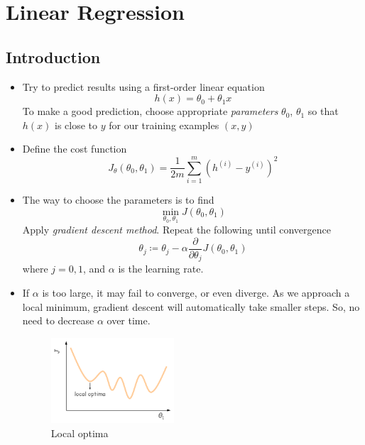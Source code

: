 \chapter{Linear Regression}


\section{Introduction}
\begin{itemize} 
    \item Try to predict results using a first-order linear equation \begin{equation} h(x) =  \theta_0 + \theta_1 x \end{equation}
    To make a good prediction, choose appropriate \emph{parameters} $\theta_0$, $\theta_1$ so that $h(x)$ is close to $y$ for our training examples $\left(x, y\right)$
    
    \item Define the cost function \begin{equation} J_\theta\left(\theta_0, \theta_1\right) = \frac{1}{2m}\sum_{i=1}^{m}{\left(h^{(i)}-y^{(i)}\right)^2} \end{equation}
    
    \item The way to choose the parameters is to find \begin{equation} \min_{\theta_0, \theta_1}{J\left(\theta_0, \theta_1\right)} \end{equation}
    Apply \emph{gradient descent method}. Repeat the following until convergence
    \begin{equation} \theta_j \coloneqq \theta_j - \alpha \frac{\partial}{\partial\theta_j}J\left(\theta_0, \theta_1\right) \end{equation} 
    where $j=0, 1$, and $\alpha$ is the learning rate.

    \item If $\alpha$ is too large, it may fail to converge, or even diverge.
    As we approach a local minimum, gradient descent will automatically take smaller steps. So, no need to decrease $\alpha$ over time.
    \begin{figure}[!htbp]
        \centering
        \includegraphics[width=1.8in]{./images/local_optima.png}
        \caption{Local optima}
    \end{figure}
\end{itemize}


